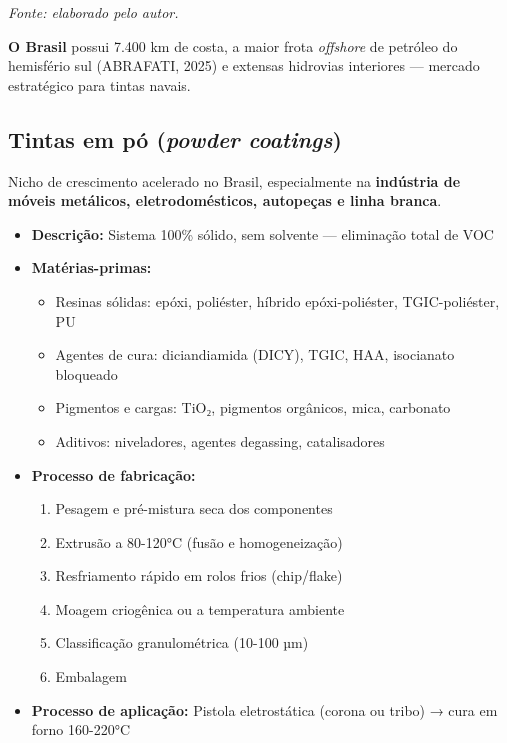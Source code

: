 \documentclass[
  12pt,
  a4paper,
  oneside,
  brazil,
  chapter=TITLE
]{article}
\newcommand{\quadrofonte}[1]{\par\noindent\textit{Fonte: #1}\vspace{1em}\par}
\begin{document}
\quadrofonte{elaborado pelo autor.}

\textbf{O Brasil} possui 7.400 km de costa, a maior frota
\emph{offshore} de petróleo do hemisfério sul (ABRAFATI, 2025) e
extensas hidrovias interiores --- mercado estratégico para tintas
navais.

\subsection{\texorpdfstring{Tintas em pó (\emph{powder
coatings})}{4.5 Tintas em pó (powder coatings)}}\label{tintas-em-puxf3-powder-coatings}

Nicho de crescimento acelerado no Brasil, especialmente na
\textbf{indústria de móveis metálicos, eletrodomésticos, autopeças e
linha branca}.

\begin{itemize}
\tightlist
\item
  \textbf{Descrição:} Sistema 100\% sólido, sem solvente --- eliminação
  total de VOC
\item
  \textbf{Matérias-primas:}

  \begin{itemize}
  \tightlist
  \item
    Resinas sólidas: epóxi, poliéster, híbrido epóxi-poliéster,
    TGIC-poliéster, PU
  \item
    Agentes de cura: diciandiamida (DICY), TGIC, HAA, isocianato
    bloqueado
  \item
    Pigmentos e cargas: TiO₂, pigmentos orgânicos, mica, carbonato
  \item
    Aditivos: niveladores, agentes degassing, catalisadores
  \end{itemize}
\item
  \textbf{Processo de fabricação:}

  \begin{enumerate}
  \def\labelenumi{\arabic{enumi}.}
  \tightlist
  \item
    Pesagem e pré-mistura seca dos componentes
  \item
    Extrusão a 80-120°C (fusão e homogeneização)
  \item
    Resfriamento rápido em rolos frios (chip/flake)
  \item
    Moagem criogênica ou a temperatura ambiente
  \item
    Classificação granulométrica (10-100 µm)
  \item
    Embalagem
  \end{enumerate}
\item
  \textbf{Processo de aplicação:} Pistola eletrostática (corona ou
  tribo) → cura em forno 160-220°C
\end{itemize}
\end{document}
